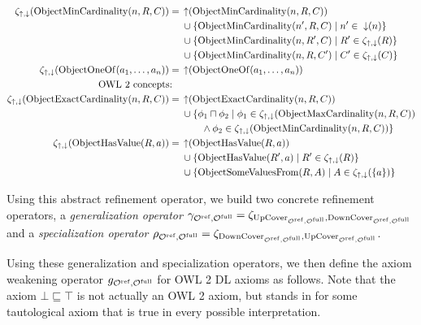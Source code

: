 \begin{definition}
\begin{widepage}
\begin{align*}
     \zeta_{\operatorname{\uparrow}, \operatorname{\downarrow}}(\operatorname{ObjectMinCardinality}(n, R, C)) ={} & \operatorname{\uparrow} (\operatorname{ObjectMinCardinality}(n, R, C)) \\& \cup \{\operatorname{ObjectMinCardinality}(n', R, C) \mid n' \in \; \operatorname{\downarrow} (n)\} \\& \cup \{\operatorname{ObjectMinCardinality}(n, R', C) \mid R' \in \zeta_{\operatorname{\uparrow}, \operatorname{\downarrow}}(R)\} \\& \cup \{\operatorname{ObjectMinCardinality}(n, R, C') \mid C' \in \zeta_{\operatorname{\uparrow}, \operatorname{\downarrow}} (C)\} \\
     \zeta_{\operatorname{\uparrow}, \operatorname{\downarrow}}(\operatorname{ObjectOneOf}(a_1, \dots, a_n)) ={} & \operatorname{\uparrow} (\operatorname{ObjectOneOf}(a_1, \dots, a_n)) \\
     \text{OWL 2 concepts:} \quad & \\
     \zeta_{\operatorname{\uparrow}, \operatorname{\downarrow}}(\operatorname{ObjectExactCardinality}(n, R, C)) ={} & \operatorname{\uparrow} (\operatorname{ObjectExactCardinality}(n, R, C)) \\& \cup \{ \phi_1 \sqcap \phi_2 \mid \phi_1 \in \zeta_{\operatorname{\uparrow}, \operatorname{\downarrow}} (\operatorname{ObjectMaxCardinality}(n, R, C)) \\ \;& \qquad \land \phi_2 \in \zeta_{\operatorname{\uparrow}, \operatorname{\downarrow}} (\operatorname{ObjectMinCardinality}(n, R, C)) \} \\
     \zeta_{\operatorname{\uparrow}, \operatorname{\downarrow}}(\operatorname{ObjectHasValue}(R, a)) ={} & \operatorname{\uparrow} (\operatorname{ObjectHasValue}(R, a)) \\& \cup \{\operatorname{ObjectHasValue}(R', a) \mid R' \in \zeta_{\operatorname{\uparrow}, \operatorname{\downarrow}} (R)\} \\& \cup \{\operatorname{ObjectSomeValuesFrom}(R, A) \mid A \in \zeta_{\operatorname{\uparrow}, \operatorname{\downarrow}} (\{a\})\}
    \end{align*}
  \end{widepage}
  Using this abstract refinement operator, we build two concrete refinement operators, a \emph{generalization operator} $\gamma_{{\mathcal{O}^\textnormal{ref}},{\mathcal{O}^\textnormal{full}}} = \zeta_{{\operatorname{UpCover}}_{{\mathcal{O}^\textnormal{ref}},{\mathcal{O}^\textnormal{full}}},{\operatorname{DownCover}}_{{\mathcal{O}^\textnormal{ref}},{\mathcal{O}^\textnormal{full}}}}$ and a \emph{specialization operator} $\rho_{{\mathcal{O}^\textnormal{ref}},{\mathcal{O}^\textnormal{full}}} = \zeta_{{\operatorname{DownCover}}_{{\mathcal{O}^\textnormal{ref}},{\mathcal{O}^\textnormal{full}}},{\operatorname{UpCover}}_{{\mathcal{O}^\textnormal{ref}},{\mathcal{O}^\textnormal{full}}}}$.
\end{definition}

Using these generalization and specialization operators, we then define the axiom weakening operator $g_{{\mathcal{O}^\textnormal{ref}},{\mathcal{O}^\textnormal{full}}}$ for OWL 2 DL axioms as follows. Note that the axiom $\bot \sqsubseteq \top$ is not actually an OWL 2 axiom, but stands in for some tautological axiom that is true in every possible interpretation.

